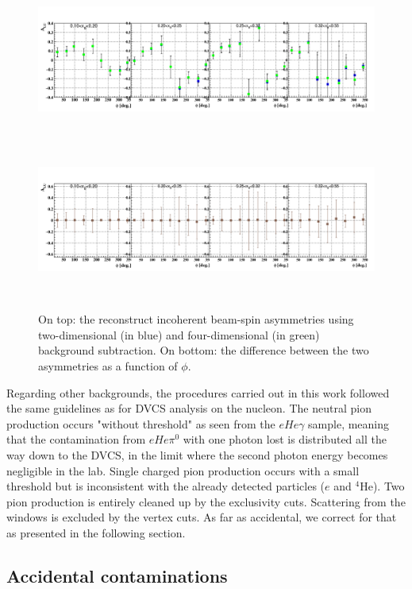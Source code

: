     \begin{figure}[tbp]
       \centering
    \includegraphics[height=5.2cm]{fig_rtpc/updates/BSA_InCoherent_xB.png}
    \includegraphics[height=5.2cm]{fig_rtpc/updates/diff_BSA_InCoherent_xB_2.png}
    \caption{On top: the reconstruct incoherent beam-spin asymmetries using    
    two-dimensional (in blue) and four-dimensional (in green) background 
 subtraction.  On bottom: the difference between the two asymmetries as a 
 function of $\phi$.}
    \label{fig:incoh_binning}
    \end{figure}                                                                  

  
Regarding other backgrounds, the procedures carried out in this work followed 
the same guidelines as for DVCS analysis on the nucleon. The neutral pion 
production occurs "without threshold" as seen from the $eHe\gamma$ sample, 
meaning that the contamination from $eHe\pi^0$ with one photon lost is 
distributed all the way down to the DVCS, in the limit where the second photon 
energy becomes negligible in the lab. Single charged pion production occurs 
with a small threshold but is inconsistent with the already detected particles 
($e$ and $^{4}$He). Two pion production is entirely cleaned up by the 
exclusivity cuts. Scattering from the windows is excluded by the vertex cuts.  
As far as accidental, we correct for that as presented in the following 
section.   


\subsection{Accidental contaminations}


